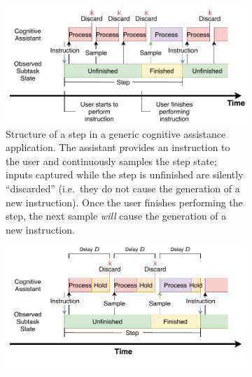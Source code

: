 \documentclass[10pt,letterpaper]{article}
\providecommand{\DIFaddtex}[1]{#1} %
\providecommand{\DIFaddbegin}{\protect\color{blue}} %
\providecommand{\DIFaddend}{\protect\color{black}} %
\providecommand{\DIFdelbegin}{\protect\color{red}} %
\providecommand{\DIFaddbeginFL}{} %
\providecommand{\DIFaddendFL}{} %
\providecommand{\DIFdelbeginFL}{} %
\providecommand{\DIFdelendFL}{} %
\providecommand{\DIFadd}[1]{\texorpdfstring{\DIFaddtex{#1}}{#1}} %
\newcommand{\DIFscaledelfig}{0.5}
\newlength{\DIFdelgraphicswidth} %
\newlength{\DIFdelgraphicsheight} %
\newcommand{\DIFaddincludegraphics}[2][]{{\color{blue}\fbox{\DIFOincludegraphics[#1]{#2}}}} %
\newcommand{\DIFdelincludegraphics}[2][]{%
\sbox{\DIFdelgraphicsbox}{\DIFOincludegraphics[#1]{#2}}%
\settoboxwidth{\DIFdelgraphicswidth}{\DIFdelgraphicsbox} %
\settoboxtotalheight{\DIFdelgraphicsheight}{\DIFdelgraphicsbox} %
\scalebox{\DIFscaledelfig}{%
\parbox[b]{\DIFdelgraphicswidth}{\usebox{\DIFdelgraphicsbox}\\[-\baselineskip] \rule{\DIFdelgraphicswidth}{0em}}\llap{\resizebox{\DIFdelgraphicswidth}{\DIFdelgraphicsheight}{%
\setlength{\unitlength}{\DIFdelgraphicswidth}%
\begin{picture}(1,1)%
\thicklines\linethickness{2pt} %
{\color[rgb]{1,0,0}\put(0,0){\framebox(1,1){}}}%
{\color[rgb]{1,0,0}\put(0,0){\line( 1,1){1}}}%
{\color[rgb]{1,0,0}\put(0,1){\line(1,-1){1}}}%
\end{picture}%
}\hspace*{3pt}}} %
} %
\DeclareRobustCommand{\DIFaddbegin}{\DIFOaddbegin \let\includegraphics\DIFaddincludegraphics} %
\DeclareRobustCommand{\DIFaddend}{\DIFOaddend \let\includegraphics\DIFOincludegraphics} %
\DeclareRobustCommand{\DIFdelbegin}{\DIFOdelbegin \let\includegraphics\DIFdelincludegraphics} %
\DeclareRobustCommand{\DIFaddbeginFL}{\DIFOaddbeginFL \let\includegraphics\DIFaddincludegraphics} %
\DeclareRobustCommand{\DIFaddendFL}{\DIFOaddendFL \let\includegraphics\DIFOincludegraphics} %
\DeclareRobustCommand{\DIFdelbeginFL}{\DIFOdelbeginFL \let\includegraphics\DIFdelincludegraphics} %
\DeclareRobustCommand{\DIFdelendFL}{\DIFOaddendFL \let\includegraphics\DIFOincludegraphics} %
\begin{document}
\DIFdelbegin %
\DIFdelendFL %
\DIFaddbeginFL 


\begin{figure}[h]
  \DIFaddendFL \centering
  \DIFdelbeginFL %
\DIFdelendFL \DIFaddbeginFL \begin{subfigure}[t]{.49\textwidth}
    \centering
    \includegraphics[width=\textwidth]{images/step_structure.pdf}
    \caption{\DIFaddbegin \DIFadd{Structure of a step in a generic cognitive assistance application. 
    The assistant provides an instruction to the user and continuously samples the step state; inputs captured while the step is unfinished are silently ``discarded'' (i.e.\ they do not cause the generation of a new instruction).
    Once the user finishes performing the step, the next sample \emph{will} cause the generation of a new instruction.
    } \DIFaddend}
    \label{fig:cogassist:step}
  \end{subfigure}%
  \hfill%
  \begin{subfigure}[t]{.49\textwidth}
    \centering
    \includegraphics[width=\textwidth]{images/step_structure_delay.pdf}

\end{subfigure}
\end{figure}
\end{document}
